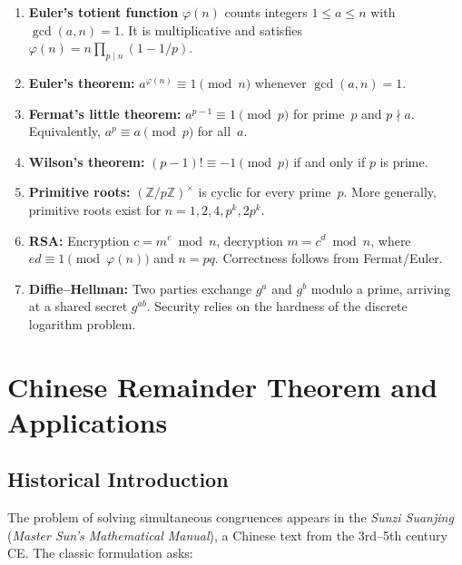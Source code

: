 \documentclass[12pt,a4paper,openany]{book}
\theoremstyle{definition}
\theoremstyle{plain}
\theoremstyle{remark}
\newcommand{\Z}{\mathbb{Z}}
\begin{document}
\begin{enumerate}
  \item \textbf{Euler's totient function} $\varphi(n)$ counts integers
        $1 \le a \le n$ with $\gcd(a,n) = 1$.  It is multiplicative and
        satisfies $\varphi(n) = n \prod_{p \mid n}(1 - 1/p)$.
  \item \textbf{Euler's theorem:} $a^{\varphi(n)} \equiv 1 \pmod{n}$
        whenever $\gcd(a,n) = 1$.
  \item \textbf{Fermat's little theorem:} $a^{p-1} \equiv 1 \pmod{p}$ for
        prime~$p$ and $p \nmid a$.  Equivalently, $a^p \equiv a \pmod{p}$
        for all~$a$.
  \item \textbf{Wilson's theorem:} $(p-1)! \equiv -1 \pmod{p}$ if and only
        if $p$ is prime.
  \item \textbf{Primitive roots:} $(\Z/p\Z)^\times$ is cyclic for every
        prime~$p$.  More generally, primitive roots exist for $n = 1, 2, 4,
        p^k, 2p^k$.
  \item \textbf{RSA:} Encryption $c = m^e \bmod n$, decryption $m = c^d
        \bmod n$, where $ed \equiv 1 \pmod{\varphi(n)}$ and $n = pq$.
        Correctness follows from Fermat/Euler.
  \item \textbf{Diffie--Hellman:} Two parties exchange $g^a$ and $g^b$
        modulo a prime, arriving at a shared secret $g^{ab}$.  Security
        relies on the hardness of the discrete logarithm problem.
\end{enumerate}


\chapter{Chinese Remainder Theorem and Applications}
\label{ch:crt}

\section*{Historical Introduction}

The problem of solving simultaneous congruences appears in the \emph{Sunzi Suanjing}
(\emph{Master Sun's Mathematical Manual}), a Chinese text from the 3rd--5th century CE.
The classic formulation asks:
\end{document}
